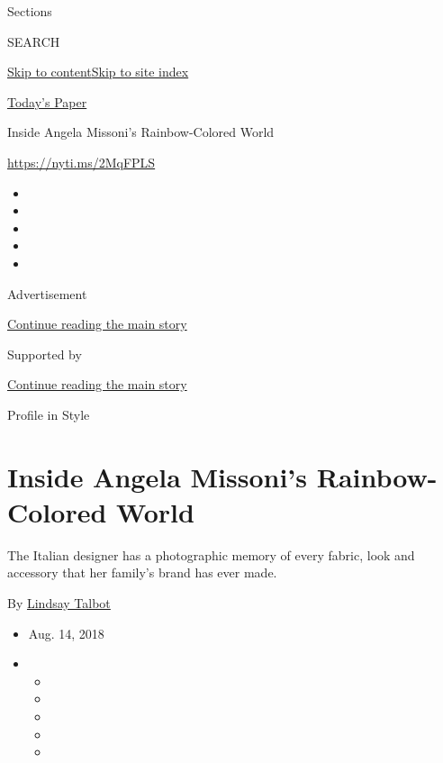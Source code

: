 Sections

SEARCH

\protect\hyperlink{site-content}{Skip to
content}\protect\hyperlink{site-index}{Skip to site index}

\href{https://myaccount.nytimes.com/auth/login?response_type=cookie\&client_id=vi}{}

\href{https://www.nytimes.com/section/todayspaper}{Today's Paper}

Inside Angela Missoni's Rainbow-Colored World

\href{https://nyti.ms/2MqFPLS}{https://nyti.ms/2MqFPLS}

\begin{itemize}
\item
\item
\item
\item
\item
\end{itemize}

Advertisement

\protect\hyperlink{after-top}{Continue reading the main story}

Supported by

\protect\hyperlink{after-sponsor}{Continue reading the main story}

Profile in Style

\hypertarget{inside-angela-missonis-rainbow-colored-world}{%
\section{Inside Angela Missoni's Rainbow-Colored
World}\label{inside-angela-missonis-rainbow-colored-world}}

The Italian designer has a photographic memory of every fabric, look and
accessory that her family's brand has ever made.

By \href{https://www.nytimes.com/by/lindsay-talbot}{Lindsay Talbot}

\begin{itemize}
\item
  Aug. 14, 2018
\item
  \begin{itemize}
  \item
  \item
  \item
  \item
  \item
  \end{itemize}
\end{itemize}

